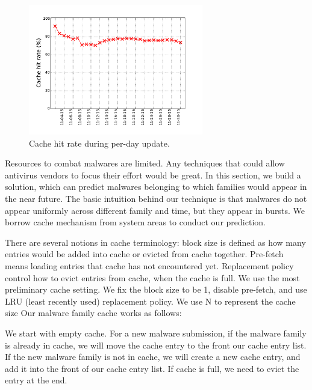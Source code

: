 \begin{figure}[t!]
\begin{center}
\includegraphics[width=3.0in]{figure/LRU_day}
\caption{Cache hit rate during per-day update.}
\label{fig:batchcache}
\end{center}
\end{figure}

Resources to combat malwares are limited. 
Any techniques that could allow antivirus vendors to focus their effort would be great. 
In this section, we build a solution, which can predict malwares belonging to which families would appear in the near future. 
The basic intuition behind our technique is that malwares do not appear uniformly across different family and time, but they appear in bursts.
We borrow cache mechanism from system areas to conduct our prediction. 

There are several notions in cache terminology: 
block size is defined as how many entries would be added into cache or evicted from cache together.
Pre-fetch means loading entries that cache has not encountered yet. 
Replacement policy control how to evict entries from cache, when the cache is full. 
We use the most preliminary cache setting. We fix the block size to be 1, disable pre-fetch, 
and use LRU (least recently used) replacement policy. We use N to represent the cache size
Our malware family cache works as follows:  

We start with empty cache. 
For a new malware submission, if the malware family is already in cache, we will move the cache entry to the front our cache entry list. 
If the new malware family is not in cache, 
we will create a new cache entry, and add it into the front of our cache entry list. 
If cache is full, we need to evict the entry at the end. 



